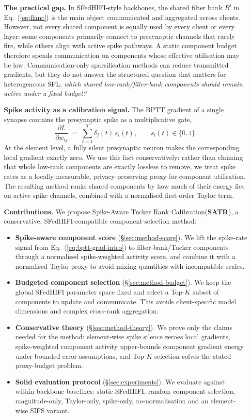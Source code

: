 \documentclass{article} %
\newcommand{\methodbf}{\textbf{SATR}}
\newcommand{\methodfull}{Spike-Aware Tucker Rank Calibration\xspace}
\begin{document}
\textbf{The practical gap.} In SFedHIFI-style backbones, the shared filter bank $B^l$ in Eq.~(\ref{eq:flanc}) is the main object communicated and aggregated across clients. However, not every shared component is equally used by every client or every layer: some components primarily connect to presynaptic channels that rarely fire, while others align with active spike pathways. A static component budget therefore spends communication on components whose effective utilisation may be low. Communication-only sparsification methods can reduce transmitted gradients, but they do not answer the structured question that matters for heterogeneous SFL: \emph{which shared low-rank/filter-bank components should remain active under a fixed budget?}

\textbf{Spike activity as a calibration signal.} The BPTT gradient of a single synapse contains the presynaptic spike as a multiplicative gate,
\begin{equation}
\frac{\partial L}{\partial w_{ij}} \;=\; \sum_{t=1}^{T} \delta_j(t)\, s_i(t),
\qquad s_i(t) \in \{0, 1\}.
\label{eq:bptt-grad-intro}
\end{equation}
At the element level, a fully silent presynaptic neuron makes the corresponding local gradient exactly zero. We use this fact conservatively: rather than claiming that whole low-rank components are exactly lossless to remove, we treat spike rates as a locally measurable, privacy-preserving proxy for component utilisation. The resulting method ranks shared components by how much of their energy lies on active spike channels, combined with a normalised first-order Taylor term.

\textbf{Contributions.} We propose \methodfull (\methodbf), a conservative, SFedHIFI-compatible component-selection method:
\begin{itemize}[leftmargin=*, itemsep=2pt, topsep=2pt]
    \item \textbf{Spike-aware component score} (\S\ref{sec:method-score}). We lift the spike-rate signal from Eq.~(\ref{eq:bptt-grad-intro}) to filter-bank/Tucker components through a normalised spike-weighted activity score, and combine it with a normalised Taylor proxy to avoid mixing quantities with incompatible scales.
    \item \textbf{Budgeted component selection} (\S\ref{sec:method-budget}). We keep the global SFedHIFI parameter space fixed and select a Top-$K$ subset of components to update and communicate. This avoids client-specific model dimensions and complex cross-rank aggregation.
    \item \textbf{Conservative theory} (\S\ref{sec:method-theory}). We prove only the claims needed for the method: element-wise spike silence zeroes local gradients, spike-weighted component activity upper-bounds component gradient energy under bounded-error assumptions, and Top-$K$ selection solves the stated proxy-budget problem.
    \item \textbf{Solid evaluation protocol} (\S\ref{sec:experiments}). We evaluate against within-backbone baselines: static SFedHIFI, random component selection, magnitude-only, Taylor-only, spike-only, no-normalisation and an element-wise SIFS variant.
\end{itemize}
\end{document}
